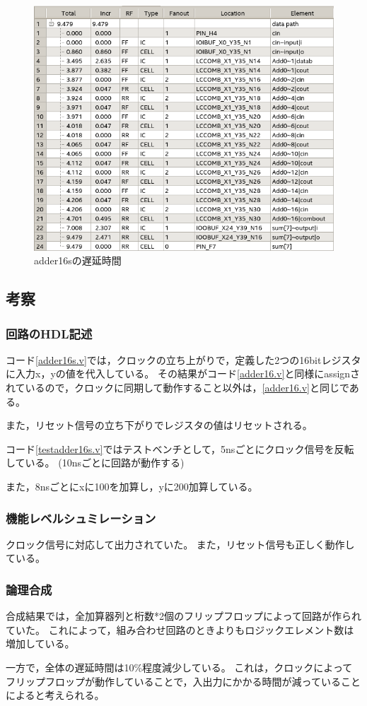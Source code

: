 \begin{figure}[H]
  \centering
  \includegraphics[width=\linewidth]{./src/adder16s/adder16sTiming.png}
  \caption{adder16sの遅延時間}
\end{figure}

\subsection{考察}
\subsubsection{回路のHDL記述}
コード\ref{adder16s.v}では，クロックの立ち上がりで，定義した2つの16bitレジスタに入力x，yの値を代入している。
その結果がコード\ref{adder16.v}と同様にassignされているので，クロックに同期して動作すること以外は，\ref{adder16.v}と同じである。

また，リセット信号の立ち下がりでレジスタの値はリセットされる。

コード\ref{testadder16s.v}ではテストベンチとして，5nsごとにクロック信号を反転している。
(10nsごとに回路が動作する)

また，8nsごとにxに100を加算し，yに200加算している。

\subsubsection{機能レベルシュミレーション}
クロック信号に対応して出力されていた。
また，リセット信号も正しく動作している。

\subsubsection{論理合成}
合成結果では，全加算器列と桁数*2個のフリップフロップによって回路が作られていた。
これによって，組み合わせ回路のときよりもロジックエレメント数は増加している。

一方で，全体の遅延時間は10\%程度減少している。
これは，クロックによってフリップフロップが動作していることで，入出力にかかる時間が減っていることによると考えられる。

